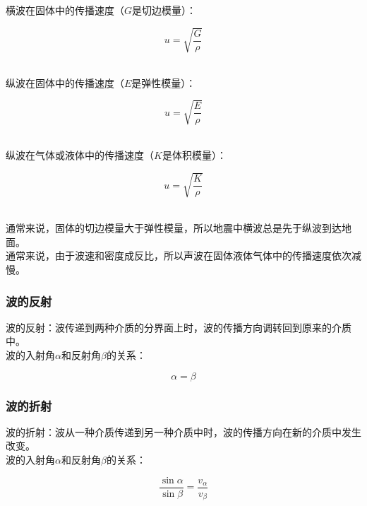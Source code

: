\documentclass[UTF8]{ctexart}
\begin{document}
\newpage

    横波在固体中的传播速度（$G$是切边模量）：
    \begin{large}
        \begin{equation*}
            u=\sqrt{\frac{G}{\rho}}
        \end{equation*}
    \end{large}\\
    纵波在固体中的传播速度（$E$是弹性模量）：
    \begin{large}
        \begin{equation*}
            u=\sqrt{\frac{E}{\rho}}
        \end{equation*}
    \end{large}\\
    纵波在气体或液体中的传播速度（$K$是体积模量）：
    \begin{large}
        \begin{equation*}
            u=\sqrt{\frac{K}{\rho}}
        \end{equation*}
    \end{large}\\
    通常来说，固体的切边模量大于弹性模量，所以地震中横波总是先于纵波到达地面。\\[3mm]
    通常来说，由于波速和密度成反比，所以声波在固体液体气体中的传播速度依次减慢。

\subsubsection{波的反射}
    波的反射：波传递到两种介质的分界面上时，波的传播方向调转回到原来的介质中。\\[3mm]
    波的入射角$\alpha$和反射角$\beta$的关系：
    \begin{large}
        \begin{equation*}
            \alpha=\beta
        \end{equation*}
    \end{large}

\subsubsection{波的折射}
    波的折射：波从一种介质传递到另一种介质中时，波的传播方向在新的介质中发生改变。\\[3mm]
    波的入射角$\alpha$和反射角$\beta$的关系：
    \begin{large}
        \begin{equation*}
            \frac{\sin{\alpha}}{\sin{\beta}}=\frac{v_\alpha}{v_\beta}
        \end{equation*}
    \end{large}
\end{document}
